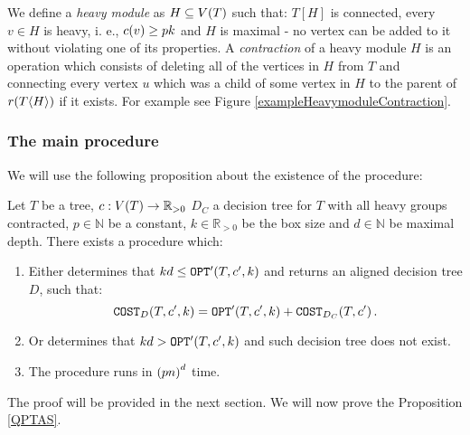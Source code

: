 
We define a \textit{heavy module} as $H\subseteq V\mathopen{}\left( T \right)$ such that: $T[H]$ is connected, every $v \in H$ is heavy, i. e., $c\mathopen{}\left( v \right)\geq pk$ and $H$ is maximal - no vertex can be added to it without violating one of its properties. A \textit{contraction} of a heavy module $H$ is an operation which consists of deleting all of the vertices in $H$ from $T$ and connecting every vertex $u$ which was a child of some vertex in $H$ to the parent of $r\mathopen{}\left( T\mathopen{}\langle H \rangle \right)$ if it exists. For example see Figure \ref{exampleHeavymoduleContraction}.

\subsubsection{The main procedure}

We will use the following proposition about the existence of the \FBuildDT procedure:
\begin{proposition}\label{BuildDTPropodisition}
     Let $T$ be a tree, $c:V\mathopen{}\left( T \right)\to \mathbb{R}_{>0}$ $D_C$ a decision tree for $T$ with all heavy groups contracted, $p\in \mathbb{N}$ be a constant, $k\in \mathbb{R}_{>0}$ be the box size and $d\in \mathbb{N}$ be maximal depth. There exists a \FBuildDT procedure which:
     \begin{enumerate}
        \item Either determines that $kd\leq \texttt{OPT}'\mathopen{}\left( T, c',k \right)$ and returns an aligned decision tree $D$, such that:
        $$
            \texttt{COST}_{D}\mathopen{}\left( T,c',k \right)=\texttt{OPT}'\mathopen{}\left( T,c',k \right)+\texttt{COST}_{D_C}\mathopen{}\left( T,c' \right).
        $$
        \item Or determines that $kd > \texttt{OPT}'\mathopen{}\left( T, c',k \right)$ and such decision tree does not exist.
        \item The procedure runs in $\mathopen{}\left( pn \right)^d$ time.
     \end{enumerate}
\end{proposition}
The proof will be provided in the next section.
We will now prove the Proposition \ref{QPTAS}.



